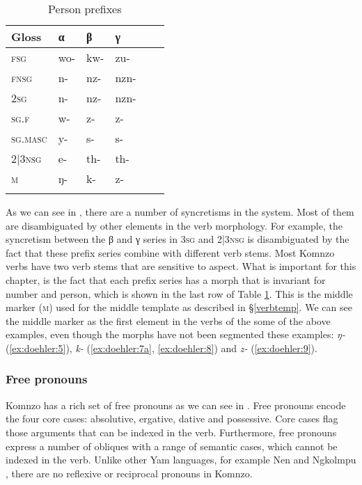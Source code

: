 \documentclass[output=paper]{langscibook}
\begin{document}
\begin{table}
	\centering
		\caption{Person prefixes}
		\begin{tabular}{llllll}
			\lsptoprule
			Gloss & α & β & γ\\
			\hline
			\textsc{f}\textsc{sg} &{wo-} & {kw-} & {zu-}\\
			\textsc{f}\textsc{nsg} &{n-} & {nz-} & {nzn-}\\
			\textsc{2sg} &{n-} & {nz-} & {nzn-}\\
			\textsc{sg}.\textsc{f} &{w-} & {z-} & {z-}\\
			\textsc{sg}.\textsc{masc} &{y-} & {s-} & {s-}\\
			2|3\textsc{nsg} &{e-} & {th-} & {th-}\\
			\textsc{m} &{ŋ-} & {k-} & {z-}\\
			\lspbottomrule
	\end{tabular}
	\label{preftable}
\end{table}

 As we can see in , there are a number of syncretisms in the system. Most of them are disambiguated by other elements in the verb morphology. For example, the syncretism between the β and γ series in 3\textsc{sg}{} and 2|3\textsc{nsg} is disambiguated by the fact that these prefix series combine with different verb stems. Most Komnzo verbs have two verb stems that are sensitive to aspect. What is important for this chapter, is the fact that each prefix series has a morph that is invariant for number and person, which is shown in the last row of Table \ref{preftable}. This is the middle marker (\textsc{m}) used for the middle template as described in \S\ref{verbtemp}. We can see the middle marker as the first element in the verbs of the some of the above examples, even though the morphs have not been segmented these examples: \emph{ŋ-} (\ref{ex:doehler:5}), \emph{k-} (\ref{ex:doehler:7a}, \ref{ex:doehler:8}) and \emph{z-} (\ref{ex:doehler:9}).
\subsubsection{Free pronouns}\label{pron}
Komnzo has a rich set of free pronouns as we can see in . Free pronouns encode the four core cases: absolutive, ergative, dative and possessive. Core cases flag those arguments that can be indexed in the verb. Furthermore, free pronouns express a number of obliques with a range of semantic cases, which cannot be indexed in the verb. Unlike other Yam languages, for example Nen \citep{Evans2015Valency} and Ngkolmpu \citep{Carroll2016}, there are no reflexive or reciprocal pronouns in Komnzo.
\end{document}
